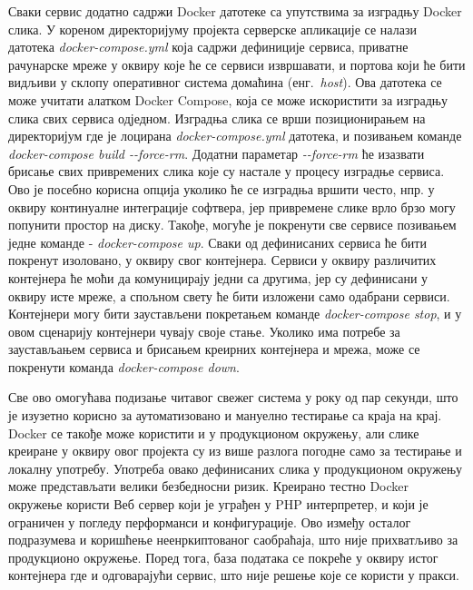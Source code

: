 \documentclass[12pt,oneside]{memoir}
\begin{document}
Сваки сервис додатно садржи Docker датотеке са упутствима за изградњу Docker слика. У кореном директоријуму пројекта серверске апликације се налази датотека \textit{docker-compose.yml} која садржи дефиниције сервиса, приватне рачунарске мреже у оквиру које ће се сервиси извршавати, и портова који ће бити видљиви у склопу оперативног система домаћина (енг.~\textit{host}). Ова датотека се може учитати алатком Docker Compose, која се може искористити за изградњу слика свих сервиса одједном. Изградња слика се врши позиционирањем на директоријум где је лоцирана \textit{docker-compose.yml} датотека, и позивањем команде \textit{docker-compose build -{}-force-rm}. Додатни параметар \textit{-{}-force-rm} ће изазвати брисање свих привремених слика које су настале у процесу изградње сервиса. Ово је посебно корисна опција уколико ће се изградња вршити често, нпр. у оквиру континуалне интеграције софтвера, јер привремене слике врло брзо могу попунити простор на диску. Такође, могуће је покренути све сервисе позивањем једне команде - \textit{docker-compose up}. Сваки од дефинисаних сервиса ће бити покренут изоловано, у оквиру свог контејнера. Сервиси у оквиру различитих контејнера ће моћи да комуницирају једни са другима, јер су дефинисани у оквиру исте мреже, а спољном свету ће бити изложени само одабрани сервиси. Контејнери могу бити заустављени покретањем команде \textit{docker-compose stop}, и у овом сценарију контејнери чувају своје стање. Уколико има потребе за заустављањем сервиса и брисањем креирних контејнера и мрежа, може се покренути команда \textit{docker-compose down}.

Све ово омогућава подизање читавог свежег система у року од пар секунди, што је изузетно корисно за аутоматизовано и мануелно тестирање са краја на крај. Docker се такође може користити и у продукционом окружењу, али слике креиране у оквиру овог пројекта су из више разлога погодне само за тестирање и локалну употребу. Употреба овако дефинисаних слика у продукционом окружењу може представљати велики безбедносни ризик. Креирано тестно Docker окружење користи Веб сервер који је уграђен у PHP интерпретер, и који је ограничен у погледу перформанси и конфигурације. Ово између осталог подразумева и коришћење неенркиптованог саобраћаја, што није прихватљиво за продукционо окружење. Поред тога, база података се покреће у оквиру истог контејнера где и одговарајући сервис, што није решење које се користи у пракси.
\end{document}
